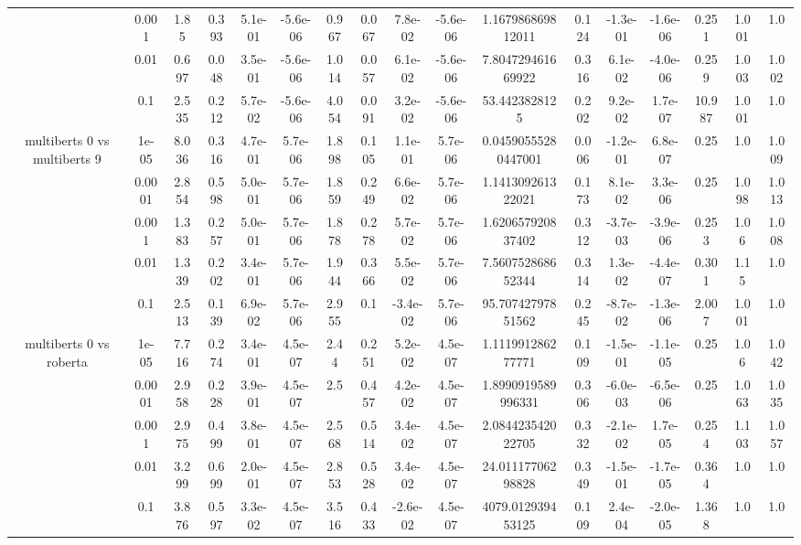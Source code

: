 \begin{tabular}{|c|c|c|c|c|c|c|c|c|c|c|c|c|c|c|c|c|}
 & 0.001 & 1.85 & 0.393 & 5.1e-01 & -5.6e-06 & 0.967 & 0.067 & 7.8e-02 & -5.6e-06 & 1.167986869812011 & 0.124 & -1.3e-01 & -1.6e-06 & 0.251 & 1.001 & 1.0 \\
 & 0.01 & 0.697 & 0.048 & 3.5e-01 & -5.6e-06 & 1.014 & 0.057 & 6.1e-02 & -5.6e-06 & 7.804729461669922 & 0.316 & 6.1e-02 & -4.0e-06 & 0.259 & 1.003 & 1.002 \\
 & 0.1 & 2.535 & 0.212 & 5.7e-02 & -5.6e-06 & 4.054 & 0.091 & 3.2e-02 & -5.6e-06 & 53.4423828125 & 0.202 & 9.2e-02 & 1.7e-07 & 10.987 & 1.001 & 1.0 \\
\hline
\multirow{5}{*}{multiberts 0 vs multiberts 9} & 1e-05 & 8.036 & 0.316 & 4.7e-01 & 5.7e-06 & 1.898 & 0.105 & 1.1e-01 & 5.7e-06 & 0.04590555280447001 & 0.006 & -1.2e-01 & 6.8e-07 & 0.25 & 1.0 & 1.009 \\
 & 0.0001 & 2.854 & 0.598 & 5.0e-01 & 5.7e-06 & 1.859 & 0.249 & 6.6e-02 & 5.7e-06 & 1.141309261322021 & 0.173 & 8.1e-02 & 3.3e-06 & 0.25 & 1.098 & 1.013 \\
 & 0.001 & 1.383 & 0.257 & 5.0e-01 & 5.7e-06 & 1.878 & 0.278 & 5.7e-02 & 5.7e-06 & 1.620657920837402 & 0.312 & -3.7e-03 & -3.9e-06 & 0.253 & 1.06 & 1.008 \\
 & 0.01 & 1.339 & 0.202 & 3.4e-01 & 5.7e-06 & 1.944 & 0.366 & 5.5e-02 & 5.7e-06 & 7.560752868652344 & 0.314 & 1.3e-02 & -4.4e-07 & 0.301 & 1.15 & 1.0 \\
 & 0.1 & 2.513 & 0.139 & 6.9e-02 & 5.7e-06 & 2.955 & 0.1 & -3.4e-02 & 5.7e-06 & 95.70742797851562 & 0.245 & -8.7e-02 & -1.3e-06 & 2.007 & 1.001 & 1.0 \\
\hline
\multirow{5}{*}{multiberts 0 vs roberta } & 1e-05 & 7.716 & 0.274 & 3.4e-01 & 4.5e-07 & 2.44 & 0.251 & 5.2e-02 & 4.5e-07 & 1.111991286277771 & 0.109 & -1.5e-01 & -1.1e-05 & 0.25 & 1.06 & 1.042 \\
 & 0.0001 & 2.958 & 0.228 & 3.9e-01 & 4.5e-07 & 2.5 & 0.457 & 4.2e-02 & 4.5e-07 & 1.8990919589996331 & 0.306 & -6.0e-03 & -6.5e-06 & 0.25 & 1.063 & 1.035 \\
 & 0.001 & 2.975 & 0.499 & 3.8e-01 & 4.5e-07 & 2.568 & 0.514 & 3.4e-02 & 4.5e-07 & 2.084423542022705 & 0.332 & -2.1e-02 & 1.7e-05 & 0.254 & 1.103 & 1.057 \\
 & 0.01 & 3.299 & 0.699 & 2.0e-01 & 4.5e-07 & 2.853 & 0.528 & 3.4e-02 & 4.5e-07 & 24.01117706298828 & 0.349 & -1.5e-01 & -1.7e-05 & 0.364 & 1.0 & 1.0 \\
 & 0.1 & 3.876 & 0.597 & 3.3e-02 & 4.5e-07 & 3.516 & 0.433 & -2.6e-02 & 4.5e-07 & 4079.012939453125 & 0.109 & 2.4e-04 & -2.0e-05 & 1.368 & 1.0 & 1.0 \\

\end{tabular}
